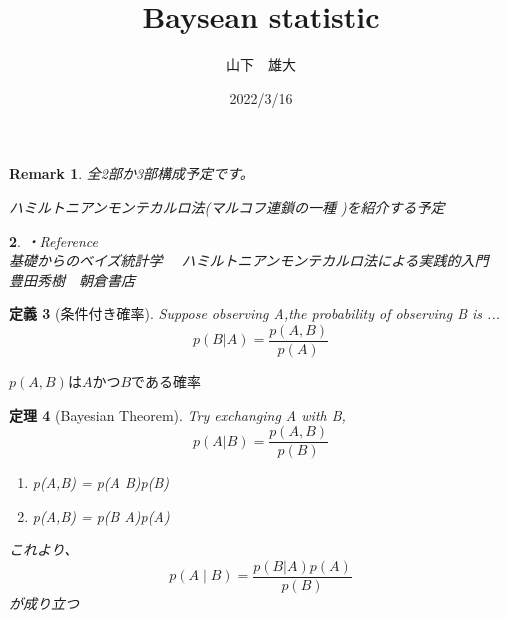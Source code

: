 \documentclass[dvipdfmx,cjk]{beamer} %
\newtheorem{thm}{定理}
\newtheorem{dfn}[thm]{定義}
\theoremstyle{example}
\newtheorem{remark}[thm]{Remark}
\newtheorem{prob}[thm]{}
\begin{document}
\title[Bayesian statistic]{Baysean statistic} 
\author[Yudai Yamashita]{山下　雄大} 
\date{2022/3/16}

\begin{frame} %
\titlepage %
\end{frame}




\begin{frame}
\begin{remark}
全2部か3部構成予定です。

ハミルトニアンモンテカルロ法(マルコフ連鎖の一種 )を紹介する予定
\end{remark}
\begin{prob}
・Reference\\
基礎からのベイズ統計学$\hspace{1em}$ ハミルトニアンモンテカルロ法による実践的入門 \\
豊田秀樹$\hspace{1em}$朝倉書店

\end{prob}

\end{frame}
\begin{frame}
\begin{dfn}[条件付き確率]
Suppose observing A,the probability of observing B is ...
$$p(B|A)= \displaystyle \frac{p(A,B)}{p(A)}$$
\end{dfn}
$p(A, B)$は$A$かつ$B$である確率
\end{frame}
\begin{frame}
\begin{thm}[Bayesian Theorem]
Try exchanging A with B,
$$p(A|B)= \displaystyle \frac{p(A,B)}{p(B)}$$
\begin{enumerate}
\item  p(A,B) = p(A \mid B)p(B) \\ 
\item  p(A,B) = p(B \mid A)p(A)　\\ 
\end{enumerate}
これより、
$$p(A \mid B)=\frac{p(B | A)p(A)}{p(B)}$$
が成り立つ

\end{thm}

\end{frame}
\end{document}
